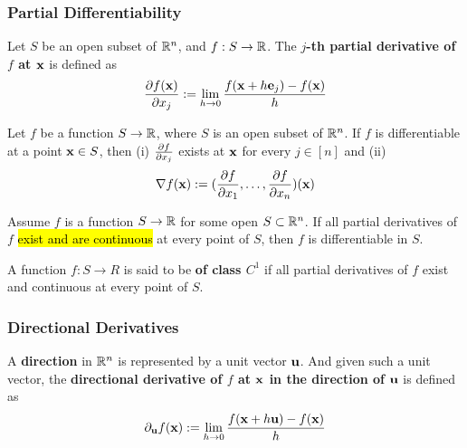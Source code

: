 \documentclass[11pt]{article}
\begin{document}
			\subsubsection{Partial Differentiability}
				\begin{definition}
					Let $S$ be an open subset of $\mathbb{R}^n$, and $f: S \to \mathbb{R}$. The \textbf{$j$-th partial derivative of $f$ at $\textbf{x}$} is defined as 
					\begin{equation}
						\frac{\partial{f(\textbf{x})}}{\partial{x_j}} := \lim_{h \to 0} \frac{f(\textbf{x} + h \textbf{e}_j) - f(\textbf{x})}{h}
					\end{equation}
				\end{definition}
				
				\begin{theorem}
					Let $f$ be a function $S \to \mathbb{R}$, where $S$ is an open subset of $\mathbb{R}^n$. If $f$ is differentiable at a point $\textbf{x} \in S$, then (i) $\frac{\partial{f}}{\partial{x_j}}$ exists at $\textbf{x}$ for every $j \in [n]$ and (ii) 
					\begin{equation}
						\nabla f(\textbf{x}) := (\frac{\partial{f}}{\partial{x_1}}, \dots, \frac{\partial{f}}{\partial{x_n}})(\textbf{x})
					\end{equation}
				\end{theorem}
				
				\begin{theorem}
					Assume $f$ is a function $S \to \mathbb{R}$ for some open $S \subset \mathbb{R}^n$. If all partial derivatives of $f$ \hl{exist and are continuous} at every point of $S$, then $f$ is differentiable in $S$.
				\end{theorem}
				
				\begin{definition}
					A function $f: S \to R$ is said to be \textbf{of class $C^1$} if all partial derivatives of $f$ exist and continuous at every point of $S$.
				\end{definition}
								
			\subsubsection{Directional Derivatives}
				\begin{definition}
					A \textbf{direction} in $\mathbb{R}^n$ is represented by a unit vector $\textbf{u}$. And given such a unit vector, the \textbf{directional derivative of $f$ at $\textbf{x}$ in the direction of $\textbf{u}$} is defined as
					\begin{equation}
						\partial_{\textbf{u}} f(\textbf{x}) := \lim_{h \to 0} \frac{f(\textbf{x} + h \textbf{u}) - f(\textbf{x})}{h}
					\end{equation}
				\end{definition}
				
\end{document}
